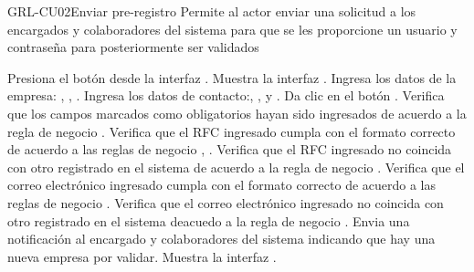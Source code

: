 \begin{UseCase}[]{GRL-CU02}{Enviar pre-registro}{
	Permite al actor enviar una solicitud a los encargados y colaboradores del sistema para que se les proporcione un usuario y contraseña
	para posteriormente ser validados 
}
\end{UseCase}

\begin{UCtrayectoria}
	\UCpaso [\UCactor] Presiona el botón  desde la interfaz .
    \UCpaso [\UCsist] Muestra la interfaz .
	\UCpaso [\UCactor] Ingresa los datos de la empresa: , , 
	.\label{cu02-grl1}
	\UCpaso [\UCactor] Ingresa los datos de contacto:, , 
	 y .
	\UCpaso [\UCactor] Da clic en el botón . 
    \UCpaso [\UCsist] Verifica que los campos marcados como obligatorios hayan sido ingresados de acuerdo a la regla de negocio .
	\UCpaso [\UCsist] Verifica que el RFC ingresado cumpla con el formato correcto de acuerdo a las reglas de negocio  , .
	\UCpaso [\UCsist] Verifica que el RFC ingresado no coincida con otro registrado en el sistema de acuerdo a la regla de negocio .
	\UCpaso [\UCsist] Verifica que el correo electrónico ingresado cumpla con el formato correcto de acuerdo a las reglas de negocio  . \label{cu02-grl2}
	\UCpaso [\UCsist] Verifica que el correo electrónico ingresado no coincida con otro registrado en el sistema deacuedo a la regla de negocio  .
	\UCpaso [\UCsist] Envia una notificación al encargado y colaboradores del sistema indicando que hay una nueva empresa por validar.
    \UCpaso [\UCsist] Muestra la interfaz .
\end{UCtrayectoria}

